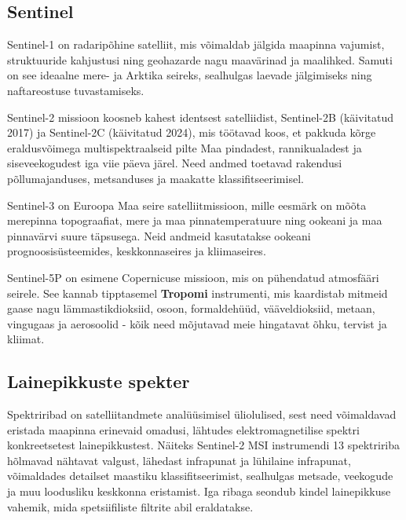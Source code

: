 \subsection{Sentinel}
Sentinel-1 on radaripõhine satelliit, mis võimaldab jälgida maapinna vajumist,
struktuuride kahjustusi ning geohazarde nagu maavärinad ja maalihked. Samuti on
see ideaalne mere- ja Arktika seireks, sealhulgas laevade jälgimiseks ning
naftareostuse tuvastamiseks. \cite{S1Applications}

Sentinel-2 missioon koosneb kahest identsest satelliidist, Sentinel-2B
(käivitatud 2017) ja Sentinel-2C (käivitatud 2024), mis töötavad koos, et
pakkuda kõrge eraldusvõimega multispektraalseid pilte Maa pindadest,
rannikualadest ja siseveekogudest iga viie päeva järel. Need andmed toetavad
rakendusi põllumajanduses, metsanduses ja maakatte klassifitseerimisel. \cite{S2Applications}

Sentinel-3 on Euroopa Maa seire satelliitmissioon, mille eesmärk on mõõta
merepinna topograafiat, mere ja maa pinnatemperatuure ning ookeani ja maa
pinnavärvi suure täpsusega. Neid andmeid kasutatakse ookeani prognoosisüsteemides,
keskkonnaseires ja kliimaseires. \cite{S3Mission}

Sentinel-5P on esimene Copernicuse missioon, mis on pühendatud atmosfääri
seirele. See kannab tipptasemel \textbf{Tropomi} instrumenti, mis kaardistab mitmeid
gaase nagu lämmastikdioksiid, osoon, formaldehüüd, vääveldioksiid, metaan,
vingugaas ja aerosoolid - kõik need mõjutavad meie hingatavat õhku, tervist ja
kliimat. \cite{S5PApplications}
\subsection{Lainepikkuste spekter}
Spektriribad on satelliitandmete analüüsimisel üliolulised, sest need
võimaldavad eristada maapinna erinevaid omadusi, lähtudes elektromagnetilise
spektri konkreetsetest lainepikkustest. Näiteks Sentinel-2 MSI instrumendi 13
spektririba hõlmavad nähtavat valgust, lähedast infrapunat ja lühilaine
infrapunat, võimaldades detailset maastiku klassifitseerimist, sealhulgas
metsade, veekogude ja muu loodusliku keskkonna eristamist. Iga ribaga seondub
kindel lainepikkuse vahemik, mida spetsiifiliste filtrite abil eraldatakse. \cite{S2Mission}
\bigskip


